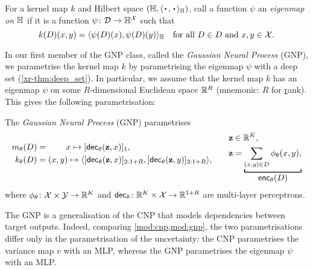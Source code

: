 \documentclass[12pt]{report}
\newcommand{\xrprefix}[1]{xr-#1}
\begin{document}
\begin{definition}[Eigenmap]
    \label{def:eigenmap}
    For a kernel map $k$ and Hilbert space $(\Hb, \lra{\vardot, \vardot}_\Hb)$, call a function $\psi$ an \emph{eigenmap on $\Hb$} if it is a function $\psi \colon \D \to \Hb^\X$ such that
    \begin{equation} \label{eq:eigenmap}
        k(D)(x, y) = \lra{\psi(D)(x), \psi(D)(y)}_{\Hb}
        \quad
        \text{for all $D \in D$ and $x, y \in \X$}.
    \end{equation}
\end{definition}

In our first member of the GNP class, called the \emph{Gaussian Neural Process} (GNP), we
parametrise the kernel map $k$ by parametrising the eigenmap $\psi$ with a deep set (\cref{\xrprefix{thm:deep_set}}).
In particular, we assume that the kernel map $k$ has an eigenmap $\psi$ on some $R$-dimensional Euclidean space $\R^R$ (mnemonic: $R$ for \underline{r}ank).
This gives the following parametrisation:

\begin{model}
    \label{mod:gnp}
    The \emph{Gaussian Neural Process} (GNP) parametrises
    \begin{equation*}
        \begin{aligned}
            m_\theta(D) &= \hspace{21pt} x \mapsto [\dec_\theta(\vz, x)]_1, \\
            k_\theta(D) &= (x, y) \mapsto \lra{[\dec_\theta(\vz, x)]_{2:1+R}, [\dec_\theta(\vz, y)]_{2:1+R}}, \\[1em]
        \end{aligned}
        \qquad
        \begin{aligned}
            \vz &\in \R^{K}, \\
            \vz &= \underbracket[1pt]{
                \sum_{(x, y) \in D} \phi_\theta(x, y),
            }_{
                \displaystyle\enc_\theta(D)
            } \\
        \end{aligned}
    \end{equation*}
    where $\phi_\theta\colon \X \times \Y \to \R^{K}$ and  $\dec_\theta \colon \R^{K} \times \X \to \R^{1 + R}$ are multi-layer perceptrons.
\end{model}

The GNP is a generalisation of the CNP that models dependencies between target outputs.
Indeed, comparing \cref{mod:cnp,mod:gnp}, the two parametrisations differ only in the parametrisation of the uncertainty:
the CNP parametrises the variance map $v$ with an MLP, whereas the GNP parametrises the eigenmap $\psi$ with an MLP.
\end{document}
